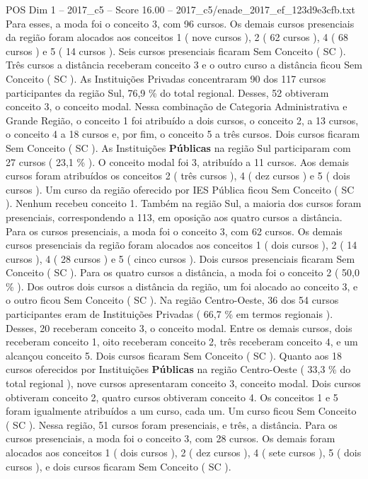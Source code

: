 \begin{textsample}{POS Dim 1 – 2017\_c5 – Score 16.00 – 2017\_c5/enade\_2017\_ef\_123d9e3cfb.txt}
Para esses, a moda foi o conceito 3, com 96 cursos.
Os demais cursos presenciais da região foram alocados aos conceitos 1 ( nove cursos ), 2 ( 62 cursos ), 4 ( 68 cursos ) e 5 ( 14 cursos ).
Seis cursos presenciais ficaram Sem Conceito ( SC ).
Três cursos a distância receberam conceito 3 e o outro curso a distância ficou Sem Conceito ( SC ).
As Instituições Privadas concentraram 90 dos 117 cursos participantes da região Sul, 76,9 \% do total regional.
Desses, 52 obtiveram conceito 3, o conceito modal.
Nessa combinação de Categoria Administrativa e Grande Região, o conceito 1 foi atribuído a dois cursos, o conceito 2, a 13 cursos, o conceito 4 a 18 cursos e, por fim, o conceito 5 a três cursos.
Dois cursos ficaram Sem Conceito ( SC ).
As Instituições \textbf{Públicas} na região Sul participaram com 27 cursos ( 23,1 \% ).
O conceito modal foi 3, atribuído a 11 cursos.
Aos demais cursos foram atribuídos os conceitos 2 ( três cursos ), 4 ( dez cursos ) e 5 ( dois cursos ).
Um curso da região oferecido por IES Pública ficou Sem Conceito ( SC ).
Nenhum recebeu conceito 1.
Também na região Sul, a maioria dos cursos foram presenciais, correspondendo a 113, em oposição aos quatro cursos a distância.
Para os cursos presenciais, a moda foi o conceito 3, com 62 cursos.
Os demais cursos presenciais da região foram alocados aos conceitos 1 ( dois cursos ), 2 ( 14 cursos ), 4 ( 28 cursos ) e 5 ( cinco cursos ).
Dois cursos presenciais ficaram Sem Conceito ( SC ).
Para os quatro cursos a distância, a moda foi o conceito 2 ( 50,0 \% ).
Dos outros dois cursos a distância da região, um foi alocado ao conceito 3, e o outro ficou Sem Conceito ( SC ).
Na região Centro-Oeste, 36 dos 54 cursos participantes eram de Instituições Privadas ( 66,7 \% em termos regionais ).
Desses, 20 receberam conceito 3, o conceito modal.
Entre os demais cursos, dois receberam conceito 1, oito receberam conceito 2, três receberam conceito 4, e um alcançou conceito 5.
Dois cursos ficaram Sem Conceito ( SC ).
Quanto aos 18 cursos oferecidos por Instituições \textbf{Públicas} na região Centro-Oeste ( 33,3 \% do total regional ), nove cursos apresentaram conceito 3, conceito modal.
Dois cursos obtiveram conceito 2, quatro cursos obtiveram conceito 4.
Os conceitos 1 e 5 foram igualmente atribuídos a um curso, cada um.
Um curso ficou Sem Conceito ( SC ).
Nessa região, 51 cursos foram presenciais, e três, a distância.
Para os cursos presenciais, a moda foi o conceito 3, com 28 cursos.
Os demais foram alocados aos conceitos 1 ( dois cursos ), 2 ( dez cursos ), 4 ( sete cursos ), 5 ( dois cursos ), e dois cursos ficaram Sem Conceito ( SC ).

\end{textsample}
